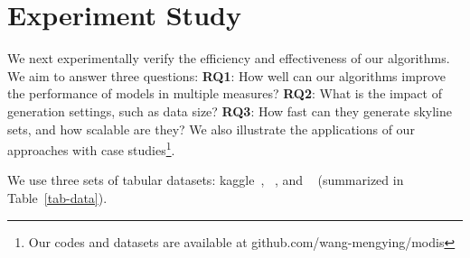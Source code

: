 
\section{Experiment Study}
\label{sec:exp}

We next experimentally verify 
the efficiency and effectiveness of 
our algorithms. We 
aim to answer three questions: 
\textbf{RQ1}: 
How well can our algorithms improve the performance of models in multiple measures? 
\textbf{RQ2}: 
What is the impact of generation settings, such as data size?
\textbf{RQ3}: 
How fast can they generate skyline sets, and how scalable are they? 
We also illustrate the applications of our approaches with case studies\footnote{
Our codes and datasets are available at 
github.com/wang-mengying/modis}.

We use three sets of tabular datasets: 
kaggle~\cite{KaggleYourHome}, \open~\cite{DataGov}, and \hf~\cite{HuggingFaceAI} (summarized in Table~\ref{tab-data}). 




